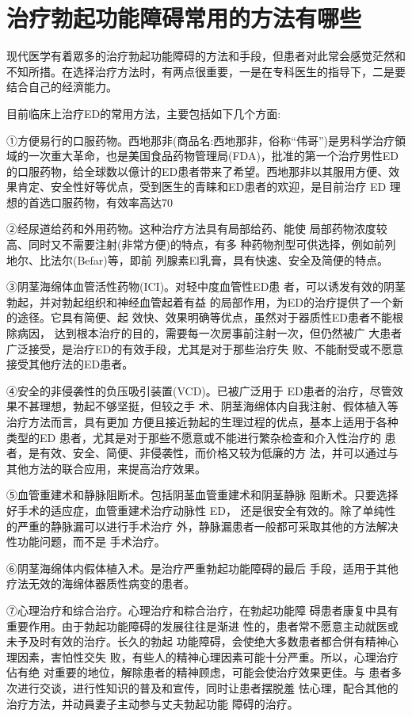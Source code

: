 \documentclass[12pt,UTF8]{ctexbook}
\begin{document}
\section{治疗勃起功能障碍常用的方法有哪些}

现代医学有着眾多的治疗勃起功能障碍的方法和手段，但患者对此常会感觉茫然和不知所措。在选择治疗方法时，有两点很重要，一是在专科医生的指导下，二是要结合自己的经濟能力。

目前临床上治疗ED的常用方法，主要包括如下几个方面:

①方便易行的口服药物。西地那非(商品名:西地那非，俗称“伟哥”)是男科学治疗領域的一次重大革命，也是美国食品药物管理局(FDA)，批准的第一个治疗男性ED的口服药物，给全球数以億计的ED患者带来了希望。西地那非以其服用方便、效果肯定、安全性好等优点，受到医生的青睐和ED患者的欢迎，是目前治疗 ED 理想的首选口服药物，有效率高达70%

②经尿道给药和外用药物。这种治疗方法具有局部给药、能使
局部药物浓度较高、同时又不需要注射(非常方便)的特点，有多
种药物剂型可供选择，例如前列地尔、比法尔(Befar)等，即前
列腺素El乳膏，具有快速、安全及简便的特点。

③阴茎海绵体血管活性药物(ICI)。对轻中度血管性ED患
者，可以诱发有效的阴茎勃起，并对勃起组织和神经血管起着有益
的局部作用，为ED的治疗提供了一个新的途径。它具有简便、起
效快、效果明确等优点，虽然对于器质性ED患者不能根除病因，
达到根本治疗的目的，需要每一次房事前注射一次，但仍然被广
大患者广泛接受，是治疗ED的有效手段，尤其是对于那些治疗失
败、不能耐受或不愿意接受其他疗法的ED患者。

④安全的非侵袭性的负压吸引装置(VCD)。已被广泛用于
ED患者的治疗，尽管效果不甚理想，勃起不够坚挺，但较之手
术、阴茎海绵体内自我注射、假体植入等治疗方法而言，具有更加
方便且接近勃起的生理过程的优点，基本上适用于各种类型的ED
患者，尤其是对于那些不愿意或不能进行繁杂检查和介入性治疗的
患者，是有效、安全、简便、非侵袭性，而价格又较为低廉的方
法，并可以通过与其他方法的联合应用，来提高治疗效果。

⑤血管重建术和静脉阻断术。包括阴茎血管重建术和阴茎静脉
阻断术。只要选择好手术的适应症，血管重建术治疗动脉性 ED，
还是很安全有效的。除了单纯性的严重的静脉漏可以进行手术治疗
外，静脉漏患者一般都可采取其他的方法解决性功能问题，而不是
手术治疗。

⑥阴茎海绵体内假体植入术。是治疗严重勃起功能障碍的最后
手段，适用于其他疗法无效的海绵体器质性病变的患者。

⑦心理治疗和综合治疗。心理治疗和粽合治疗，在勃起功能障
碍患者康复中具有重要作用。由于勃起功能障碍的发展往往是渐进
性的，患者常不愿意主动就医或未予及时有效的治疗。长久的勃起
功能障碍，会使绝大多数患者都合併有精神心理因素，害怕性交失
败，有些人的精神心理因素可能十分严重。所以，心理治疗佔有绝
对重要的地位，解除患者的精神顾虑，可能会使治疗效果更佳。与
患者多次进行交谈，进行性知识的普及和宣传，同时让患者摆脱羞
怯心理，配合其他的治疗方法，并动員妻子主动参与丈夫勃起功能
障碍的治疗。
\end{document}
